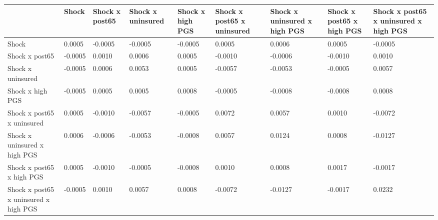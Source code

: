 % 
\begin{tabular}{p{5cm}p{2cm}p{2cm}p{2cm}p{2cm}p{2cm}p{2cm}p{2cm}p{2cm}}
  \hline
 & Shock & Shock x post65 & Shock x uninsured & Shock x high PGS & Shock x post65 x uninsured & Shock x uninsured x high PGS &  Shock x post65 x high PGS & Shock x post65 x uninsured x high PGS \\ 
  \hline
Shock & 0.0005 & -0.0005 & -0.0005 & -0.0005 & 0.0005 & 0.0006 & 0.0005 & -0.0005 \\ 
  Shock x post65 & -0.0005 & 0.0010 & 0.0006 & 0.0005 & -0.0010 & -0.0006 & -0.0010 & 0.0010 \\ 
  Shock x uninsured & -0.0005 & 0.0006 & 0.0053 & 0.0005 & -0.0057 & -0.0053 & -0.0005 & 0.0057 \\ 
  Shock x high PGS & -0.0005 & 0.0005 & 0.0005 & 0.0008 & -0.0005 & -0.0008 & -0.0008 & 0.0008 \\ 
  Shock x post65 x uninsured & 0.0005 & -0.0010 & -0.0057 & -0.0005 & 0.0072 & 0.0057 & 0.0010 & -0.0072 \\ 
  Shock x uninsured x high PGS & 0.0006 & -0.0006 & -0.0053 & -0.0008 & 0.0057 & 0.0124 & 0.0008 & -0.0127 \\ 
   Shock x post65 x high PGS & 0.0005 & -0.0010 & -0.0005 & -0.0008 & 0.0010 & 0.0008 & 0.0017 & -0.0017 \\ 
  Shock x post65 x uninsured x high PGS & -0.0005 & 0.0010 & 0.0057 & 0.0008 & -0.0072 & -0.0127 & -0.0017 & 0.0232 \\ 
   \hline
\end{tabular}
